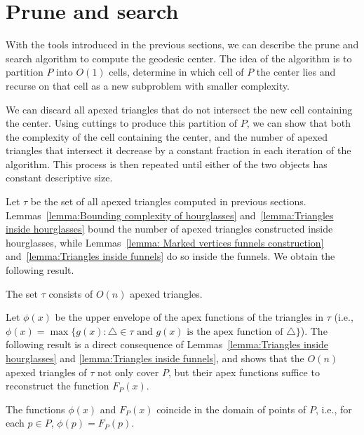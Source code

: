 \documentclass[a4paper,UKenglish]{lipics}
\newcommand{\F}[2]{\ensuremath{F_{\scriptscriptstyle #1}(#2)}}
\newcommand{\fn}[2]{\ensuremath{S_{\scriptscriptstyle #1}(#2)}}
\newcommand{\ff}[1]{\ensuremath{f(#1)}}
\newcommand{\g}[2]{\ensuremath{|\pi(#1, #2)|}}
\begin{document}
\section{Prune and search}\label{section:Prune and search}
With the tools introduced in the previous sections, we can describe the prune and search algorithm to compute the geodesic center. 
The idea of the algorithm is to partition $P$ into $O(1)$ cells, determine in which cell of $P$ the center lies and recurse on that cell as a new subproblem with smaller complexity.

We can discard all apexed triangles that do not intersect the new cell containing the center. Using cuttings to produce this partition of $P$, we can show that both the complexity of the cell containing the center, and the number of apexed triangles that intersect it decrease by a constant fraction in each iteration of the algorithm. This process is then repeated until either of the two objects has constant descriptive size. 

Let $\tau$ be the set of all apexed triangles computed in previous sections. 
Lemmas~\ref{lemma:Bounding complexity of hourglasses} and~\ref{lemma:Triangles inside hourglasses} bound the number of apexed triangles constructed inside hourglasses, while Lemmas~\ref{lemma: Marked vertices funnels construction} and~\ref{lemma:Triangles inside funnels} do so inside the funnels. We obtain the following result.

\begin{corollary}\label{lemma:Size of tau}
The set $\tau$ consists of $O(n)$ apexed triangles.
\end{corollary}

Let $\phi(x)$ be the upper envelope of the apex functions of the triangles in $\tau$ (i.e., $\phi(x) = \max\{g(x) : \triangle \in \tau\text{ and $g(x)$ is the apex function of $\triangle$} \}$). The following result is a direct consequence of Lemmas~\ref{lemma:Triangles inside hourglasses} and \ref{lemma:Triangles inside funnels}, and shows that the $O(n)$ apexed triangles of $\tau$ not only cover $P$, but their apex functions suffice to reconstruct the function $\F{P}{x}$.

\begin{lemma}\label{lemma:Optimization problem same as geodesic center}
The functions $\phi(x)$ and $\F{P}{x}$ coincide in the domain of points of $P$, i.e., for each $p\in P$, $\phi(p) = \F{P}{p}$.
\end{lemma}
\end{document}
